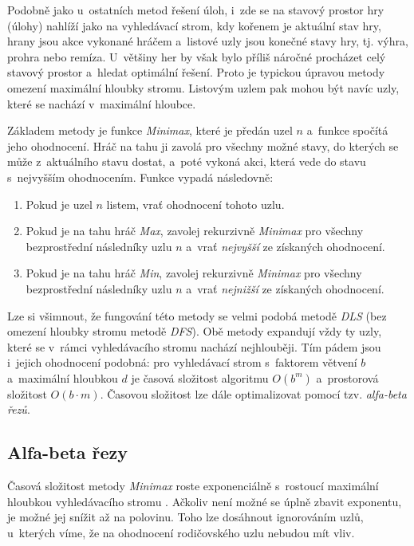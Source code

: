 Podobně jako u~ostatních metod řešení úloh, i~zde se na stavový prostor hry (úlohy) nahlíží jako na vyhledávací strom, kdy kořenem je aktuální stav hry, hrany jsou akce vykonané hráčem a~listové uzly jsou konečné stavy hry, tj. výhra, prohra nebo remíza. U~většiny her by však bylo příliš náročné procházet celý stavový prostor a~hledat optimální řešení. Proto je typickou úpravou metody omezení maximální hloubky stromu. Listovým uzlem pak mohou být navíc uzly, které se nachází v~maximální hloubce.

Základem metody je funkce \emph{Minimax}, které je předán uzel $n$ a~funkce spočítá jeho ohodnocení. Hráč na tahu ji zavolá pro všechny možné stavy, do kterých se může z~aktuálního stavu dostat, a~poté vykoná akci, která vede do stavu s~nejvyšším ohodnocením. Funkce vypadá následovně:\enlargethispage{-1\baselineskip} %
\begin{enumerate}
    \item Pokud je uzel $n$ listem, vrať ohodnocení tohoto uzlu.
    \item Pokud je na tahu hráč \emph{Max}, zavolej rekurzivně \emph{Minimax} pro všechny bezprostřední následníky uzlu $n$ a~vrať \emph{nejvyšší} ze získaných ohodnocení.
    \item Pokud je na tahu hráč \emph{Min}, zavolej rekurzivně \emph{Minimax} pro všechny bezprostřední následníky uzlu $n$ a~vrať \emph{nejnižší} ze získaných ohodnocení.
\end{enumerate}

Lze si všimnout, že fungování této metody se velmi podobá metodě \emph{DLS} (bez omezení hloubky stromu metodě \emph{DFS}). Obě metody expandují vždy ty uzly, které se v~rámci vyhledávacího stromu nachází nejhlouběji. Tím pádem jsou i~jejich ohodnocení podobná: pro vyhledávací strom s~faktorem větvení $b$ a~maximální hloubkou $d$ je časová složitost algoritmu $O(b^m)$ a~prostorová složitost $O(b \cdot m)$. Časovou složitost lze dále optimalizovat pomocí tzv. \emph{alfa-beta řezů}.

\subsection*{Alfa-beta řezy}

Časová složitost metody \emph{Minimax} roste exponenciálně s~rostoucí maximální hloubkou vyhledávacího stromu \cite{AI_Russel_Norvig}. Ačkoliv není možné se úplně zbavit exponentu, je možné jej snížit až na polovinu. Toho lze dosáhnout ignorováním uzlů, u~kterých víme, že na ohodnocení rodičovského uzlu nebudou mít vliv.

